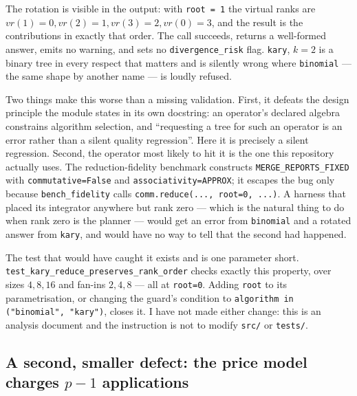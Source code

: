\documentclass[11pt]{article}
\begin{document}
The rotation is visible in the output: with \texttt{root = 1} the virtual ranks are
$vr(1)=0, vr(2)=1, vr(3)=2, vr(0)=3$, and the result is the contributions in exactly that
order. The call succeeds, returns a well-formed answer, emits no warning, and sets no
\texttt{divergence\_risk} flag. \texttt{kary}, $k=2$ is a binary tree in every respect that
matters and is silently wrong where \texttt{binomial} --- the same shape by another name --- is
loudly refused.

Two things make this worse than a missing validation. First, it defeats the design principle
the module states in its own docstring: an operator's declared algebra constrains algorithm
selection, and ``requesting a tree for such an operator is an error rather than a silent
quality regression''. Here it is precisely a silent regression. Second, the operator most
likely to hit it is the one this repository actually uses. The reduction-fidelity benchmark
constructs \texttt{MERGE\_REPORTS\_FIXED} with \texttt{commutative=False} and
\texttt{associativity=APPROX}; it escapes the bug only because \texttt{bench\_fidelity} calls
\texttt{comm.reduce(..., root=0, ...)}. A harness that placed its integrator anywhere but rank
zero --- which is the natural thing to do when rank zero is the planner --- would get an error
from \texttt{binomial} and a rotated answer from \texttt{kary}, and would have no way to tell
that the second had happened.

The test that would have caught it exists and is one parameter short.
\texttt{test\_kary\_reduce\_preserves\_rank\_order} checks exactly this property, over sizes
$4, 8, 16$ and fan-ins $2, 4, 8$ --- all at \texttt{root=0}. Adding \texttt{root} to its
parametrisation, or changing the guard's condition to
\texttt{algorithm in ("binomial", "kary")}, closes it. I have not made either change: this is
an analysis document and the instruction is not to modify \texttt{src/} or \texttt{tests/}.

\subsection*{A second, smaller defect: the price model charges \texorpdfstring{$p-1$}{p-1} applications}
\end{document}
